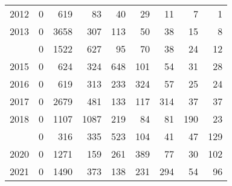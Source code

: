 \documentclass[
]{article}
\begin{document}
\begin{longtable}[t]{lrrrrrrrr}
2012 & 0 & 619 & 83 & 40 & 29 & 11 & 7 & 1\\
2013 & 0 & 3658 & 307 & 113 & 50 & 38 & 15 & 8\\
\addlinespace
2014 & 0 & 1522 & 627 & 95 & 70 & 38 & 24 & 12\\
2015 & 0 & 624 & 324 & 648 & 101 & 54 & 31 & 28\\
2016 & 0 & 619 & 313 & 233 & 324 & 57 & 25 & 24\\
2017 & 0 & 2679 & 481 & 133 & 117 & 314 & 37 & 37\\
2018 & 0 & 1107 & 1087 & 219 & 84 & 81 & 190 & 23\\
\addlinespace
2019 & 0 & 316 & 335 & 523 & 104 & 41 & 47 & 129\\
2020 & 0 & 1271 & 159 & 261 & 389 & 77 & 30 & 102\\
2021 & 0 & 1490 & 373 & 138 & 231 & 294 & 54 & 96\\*
\end{longtable}
\end{document}

